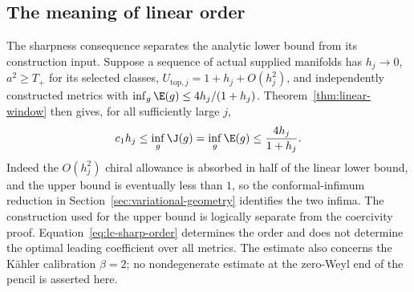 \subsection{The meaning of linear order}

The sharpness consequence separates the analytic lower bound from its
construction input.  Suppose a sequence of actual supplied manifolds has
$h_j\to0$, $a^2\ge T_+$ for its selected classes,
$U_{\mathrm{top},j}=1+h_j+O(h_j^2)$, and independently constructed
metrics with
$\inf_g\E(g)\le4h_j/(1+h_j)$.  Theorem~\ref{thm:linear-window}
then gives, for all sufficiently large $j$,
\begin{equation}\label{eq:lc-sharp-order}
 c_1h_j\le\inf_g\J(g)=\inf_g\E(g)
                     \le\frac{4h_j}{1+h_j}.
\end{equation}
Indeed the $O(h_j^2)$ chiral allowance is absorbed in half of the
linear lower bound, and the upper bound is eventually less than $1$,
so the conformal-infimum reduction in
Section~\ref{sec:variational-geometry} identifies the two infima.
The construction used for the upper bound is logically separate
from the coercivity proof.  Equation~\eqref{eq:lc-sharp-order}
determines the order and does not determine the optimal leading
coefficient over all metrics.  The estimate also concerns the
K\"ahler calibration $\beta=2$; no nondegenerate estimate at the
zero-Weyl end of the pencil is asserted here.
